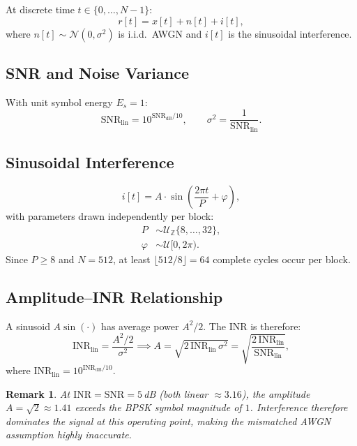 \documentclass[11pt,a4paper]{article}
\newtheorem{remark}{Remark}[section]
\newcommand{\snr}{\text{SNR}}
\newcommand{\inr}{\text{INR}}
\begin{document}
At discrete time $t \in \{0,\ldots,N-1\}$:
\begin{equation}
  r[t] = x[t] + n[t] + i[t],
  \label{eq:channel}
\end{equation}
where $n[t] \sim \mathcal{N}(0, \sigma^2)$ is i.i.d.\ AWGN and $i[t]$ is the sinusoidal interference.

\subsection{SNR and Noise Variance}

With unit symbol energy $E_s = 1$:
\begin{equation}
  \snr_{\text{lin}} = 10^{\snr_{\text{dB}}/10},
  \qquad
  \sigma^2 = \frac{1}{\snr_{\text{lin}}}.
\end{equation}

\subsection{Sinusoidal Interference}

\begin{equation}
  i[t] = A \cdot \sin\!\left(\frac{2\pi t}{P} + \varphi\right),
  \label{eq:interference}
\end{equation}
with parameters drawn independently per block:
\begin{align}
  P      &\sim \mathcal{U}_{\mathbb{Z}}\{8, \ldots, 32\}, \\
  \varphi &\sim \mathcal{U}[0, 2\pi).
\end{align}
Since $P \geq 8$ and $N = 512$, at least $\lfloor 512/8 \rfloor = 64$ complete cycles occur per block.

\subsection{Amplitude--INR Relationship}

A sinusoid $A\sin(\cdot)$ has average power $A^2/2$. The INR is therefore:
\begin{equation}
  \inr_{\text{lin}} = \frac{A^2/2}{\sigma^2}
  \implies
  A = \sqrt{2\,\inr_{\text{lin}}\,\sigma^2} = \sqrt{\frac{2\,\inr_{\text{lin}}}{\snr_{\text{lin}}}},
  \label{eq:amplitude}
\end{equation}
where $\inr_{\text{lin}} = 10^{\inr_{\text{dB}}/10}$.

\begin{remark}
At $\inr = \snr = 5$\,dB (both linear $\approx 3.16$), the amplitude $A = \sqrt{2} \approx 1.41$ exceeds the BPSK symbol magnitude of $1$. Interference therefore dominates the signal at this operating point, making the mismatched AWGN assumption highly inaccurate.
\end{remark}
\end{document}
